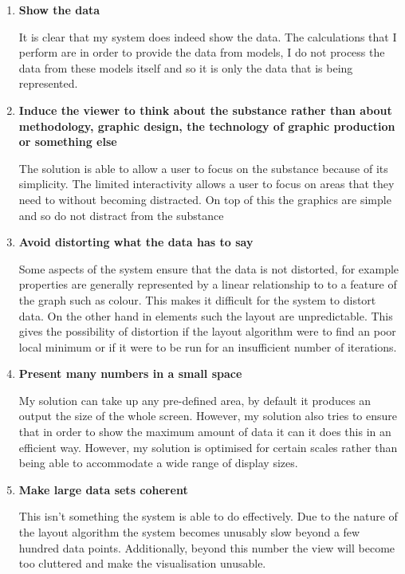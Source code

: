 \documentclass[12pt,a4paper]{article}
\begin{document}
\begin{enumerate}
\item {\bf Show the data}

It is clear that my system does indeed show the data. The calculations that I perform are in order to provide the data from models, I do not process the data from these models itself and so it is only the data that is being represented.

\item {\bf Induce the viewer to think about the substance rather than about methodology, graphic design, the technology of graphic production or something else}

The solution is able to allow a user to focus on the substance because of its simplicity. The limited interactivity allows a user to focus on areas that they need to without becoming distracted. On top of this the graphics  are simple and so do not distract from the substance

\item {\bf Avoid distorting what the data has to say}

Some aspects of the system ensure that the data is not distorted, for example properties are generally represented by a linear relationship to to a feature of the graph such as colour. This makes it difficult for the system to distort data. On the other hand in elements such the layout are unpredictable. This gives the possibility of distortion if the layout algorithm were to find an poor local minimum or if it were to be run for an insufficient number of iterations.

\item {\bf Present many numbers in a small space}

My solution can take up any pre-defined area, by default it produces an output the size of the whole screen. However, my solution also tries to ensure that in order to show the maximum amount of data it can it does this in an efficient way. However, my solution is optimised for certain scales rather than being able to accommodate a wide range of display sizes.

\item {\bf Make large data sets coherent}

This isn't something the system is able to do effectively. Due to the nature of the layout algorithm the system becomes unusably slow beyond a few hundred data points. Additionally, beyond this number the view will become too cluttered and make the visualisation unusable.


\end{enumerate}
\end{document}
